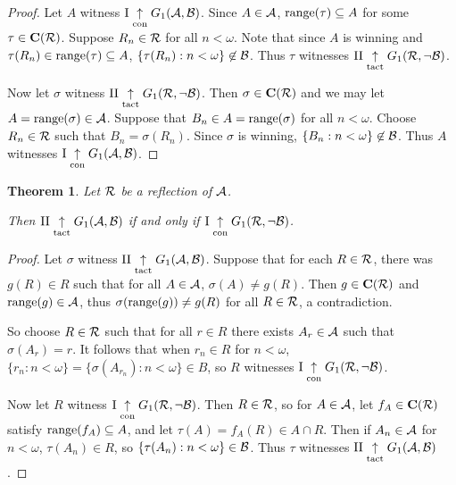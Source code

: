 \documentclass{amsart}
\theoremstyle{plain}
\newtheorem{theorem}{Theorem}
\theoremstyle{definition}
\theoremstyle{remark}
\theoremstyle{plain}
\theoremstyle{definition}
\theoremstyle{remark}
\begin{document}
\begin{proof}
  Let \(A\) witness 
  \(\mathrm{I}\underset{\text{con}}{\uparrow}G_{1}(\mathcal{A},\mathcal{B})\).
  Since \(A\in\mathcal{A}\),
  \(\text{range}(\tau)\subseteq A\)
  for some \(\tau\in\mathbf C(\mathcal{R})\). 
  Suppose \(R_n\in \mathcal{R}\) for all \(n<\omega\).
  Note that since \(A\) is winning and 
  \(\tau(R_n)\in\text{range}(\tau)\subseteq A\),
  \(\{\tau(R_n):n<\omega\}\not\in\mathcal{B}\). Thus \(\tau\) witnesses
  \(\mathrm{II}\underset{\text{tact}}{\uparrow}G_{1}(\mathcal{R},\neg\mathcal{B})\).

  Now let \(\sigma\) witness
  \(\mathrm{II}\underset{\text{tact}}{\uparrow}G_{1}(\mathcal{R},\neg\mathcal{B})\).
  Then \(\sigma\in\mathbf C(\mathcal{R})\) and we may let
  \(A=\text{range}(\sigma)\in\mathcal{A}\). 
  Suppose that \(B_n\in A=\text{range}(\sigma)\) for
  all \(n<\omega\). Choose \(R_n\in\mathcal{R}\) such that 
  \(B_n=\sigma(R_n)\). Since \(\sigma\) is winning,
  \(\{B_n:n<\omega\}\not\in\mathcal{B}\). Thus \(A\) witnesses
  \(\mathrm{I}\underset{\text{con}}{\uparrow}G_{1}(\mathcal{A},\mathcal{B})\).
\end{proof}

\begin{theorem}
  Let \(\mathcal{R}\) be a reflection of \(\mathcal{A}\). 

  Then
  \(\mathrm{II}\underset{\text{tact}}{\uparrow}G_{1}(\mathcal{A},\mathcal{B})\) if and only if
  \(\mathrm{I}\underset{\text{con}}{\uparrow}G_{1}(\mathcal{R},\neg\mathcal{B})\).
\end{theorem}

\begin{proof}
  Let \(\sigma\) witness 
  \(\mathrm{II}\underset{\text{tact}}{\uparrow}G_{1}(\mathcal{A},\mathcal{B})\).
  Suppose that for each \(R\in\mathcal{R}\),
  there was \(g(R)\in R\) such that for all \(A\in \mathcal{A}\),
  \(\sigma(A)\not=g(R)\). Then \(g\in\mathbf C(\mathcal{R})\)
  and \(\text{range}(g)\in\mathcal{A}\),
  thus \(\sigma(\text{range}(g))\not=g(R)\) for all \(R\in\mathcal{R}\),
  a contradiction.

  So choose \(R\in\mathcal{R}\) such that for all \(r\in R\)
  there exists \(A_r\in\mathcal{A}\) such that \(\sigma(A_r)=r\).
  It follows that when \(r_n\in R\) for \(n<\omega\),
  \(\{r_n:n<\omega\}=\{\sigma(A_{r_n}):n<\omega\}\in B\),
  so \(R\) witnesses
  \(\mathrm{I}\underset{\text{con}}{\uparrow}G_{1}(\mathcal{R},\neg\mathcal{B})\).

  Now let \(R\) witness 
  \(\mathrm{I}\underset{\text{con}}{\uparrow}G_{1}(\mathcal{R},\neg\mathcal{B})\).
  Then \(R\in\mathcal{R}\), so for \(A\in\mathcal{A}\), let
  \(f_A\in\mathbf C(\mathcal{R})\) satisfy \(\text{range}(f_A)\subseteq A\),
  and let \(\tau(A)=f_A(R)\in A\cap R\).
  Then if \(A_n\in\mathcal{A}\) for \(n<\omega\), \(\tau(A_n)\in R\),
  so \(\{\tau(A_n):n<\omega\}\in\mathcal{B}\).
  Thus \(\tau\) witnesses
  \(\mathrm{II}\underset{\text{tact}}{\uparrow}G_{1}(\mathcal{A},\mathcal{B})\).
\end{proof}
\end{document}
